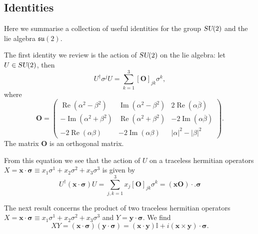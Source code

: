 \documentclass[12pt]{amsart}
\newcommand{\Real}{\operatorname{Re}}
\newcommand{\Imag}{\operatorname{Im}}
\def\su2{\textsl{SU}(2)}
\def\lasu2{\mathfrak{su}(2)}
\theoremstyle{definition}
\theoremstyle{remark}
\numberwithin{equation}{section}
\begin{document}
\subsection{Identities}
Here we summarise a collection of useful identities for the group $\su2$ and the lie algebra $\lasu2$.

The first identity we review is the action of $\su2$ on the lie algebra: let $U\in\su2$, then
\begin{equation}
	U^\dag \sigma^j U  = \sum_{k=1}^3[\mathbf{O}]_{jk}\sigma^k,
\end{equation}
where
\begin{equation}
	\mathbf{O} = \begin{pmatrix} \Real(\alpha^2 - \beta^2) &  \Imag(\alpha^2 - \beta^2) & 2\Real(\alpha\overline{\beta}) \\ -\Imag(\alpha^2 + \beta^2) & \Real(\alpha^2+\beta^2) & -2\Imag(\alpha\overline{\beta}) \\ -2\Real(\alpha\beta) &  -2\Imag(\alpha\beta) & |\alpha|^2-|\beta|^2\end{pmatrix}.
\end{equation}
The matrix $\mathbf{O}$ is an orthogonal matrix.

From this equation we see that the action of $U$ on a traceless hermitian operators $X = \mathbf{x}\cdot\boldsymbol{\sigma} \equiv x_1\sigma^1 + x_2\sigma^2 +x_3\sigma^3$ is given by
\begin{equation}
	U^\dag  (\mathbf{x}\cdot\boldsymbol{\sigma}) U  = \sum_{j,k=1}^3 x_j [\mathbf{O}]_{jk}\sigma^k = (\mathbf{x}\mathbf{O})\cdot.\boldsymbol{\sigma}
\end{equation}

The next result concerns the product of two traceless hermitian operators $X = \mathbf{x}\cdot\boldsymbol{\sigma} \equiv x_1\sigma^1 + x_2\sigma^2 +x_3\sigma^3$ and $Y = \mathbf{y}\cdot \boldsymbol{\sigma}$. We find
\begin{equation}
	XY = (\mathbf{x}\cdot\boldsymbol{\sigma})(\mathbf{y}\cdot\boldsymbol{\sigma}) = (\mathbf{x}\cdot \mathbf{y})\mathbb{I} + i (\mathbf{x}\times \mathbf{y})\cdot \boldsymbol{\sigma}.
\end{equation}
\end{document}
